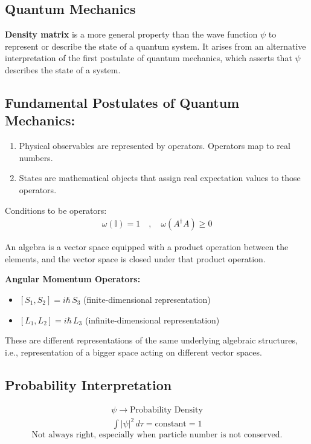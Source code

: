 \documentclass[14pt]{article} %
\begin{document}
\subsection{Quantum Mechanics}
\textbf{Density matrix} is a more general property than the wave function $\psi$ to represent or describe the state of a quantum system. It arises from an alternative interpretation of the first postulate of quantum mechanics, which asserts that $\psi$ describes the state of a system.
\subsection*{Fundamental Postulates of Quantum Mechanics:}
\begin{enumerate}
    \item Physical observables are represented by operators. Operators map to real numbers.
    \item States are mathematical objects that assign real expectation values to those operators.
\end{enumerate}
Conditions to be operators:
\begin{align*}
\omega(\mathbb{I}) = 1 \quad , \quad \omega(A^\dagger A) \geq 0
\end{align*}
\begin{tcolorbox}[ title=\textbf{Question: What is algebra?}]
An algebra is a vector space equipped with a product operation between the elements, and the vector space is closed under that product operation.
\end{tcolorbox}
\textbf{Angular Momentum Operators:}
\begin{itemize}
    \item $[S_1, S_2] = i\hbar\, S_3$ \hfill (finite-dimensional representation)
    \item $[L_1, L_2] = i\hbar\, L_3$ \hfill (infinite-dimensional representation)
\end{itemize}
These are different representations of the same underlying algebraic structures, i.e., representation of a bigger space acting on different vector spaces.
\subsection*{Probability Interpretation}
\begin{align*}
\psi \rightarrow \text{Probability Density}
\end{align*}
\begin{align*}
    \int |\psi|^2 \, d\tau = \text{constant} =1
\end{align*}
$$\text{Not always right, especially when particle number is not conserved.}$$
\end{document}
